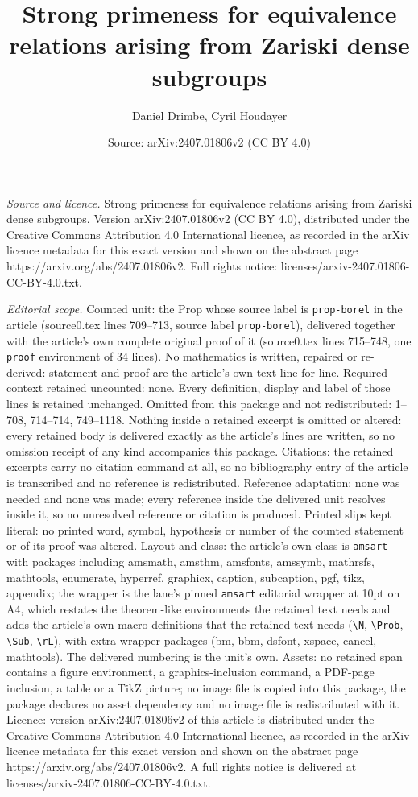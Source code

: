 \documentclass[10pt,a4paper]{amsart}
\title[Strong primeness for equivalence relations arising from Zari]{Strong primeness for equivalence relations arising from Zariski dense subgroups}
\author{Daniel Drimbe, Cyril Houdayer}
\date{Source: arXiv:2407.01806v2 (CC BY 4.0)}
\begin{document}
\maketitle

\noindent\emph{Source and licence.} Strong primeness for equivalence relations arising from Zariski dense subgroups. Version arXiv:2407.01806v2 (CC BY 4.0), distributed under the Creative Commons Attribution 4.0 International licence, as recorded in the arXiv licence metadata for this exact version and shown on the abstract page https://arxiv.org/abs/2407.01806v2. Full rights notice: licenses/arxiv-2407.01806-CC-BY-4.0.txt.\par\smallskip

\noindent\textit{Editorial scope.} Counted unit: the Prop whose source label is \texttt{prop-borel} in the article (source0.tex lines 709--713, source label \texttt{prop-borel}), delivered together with the article's own complete original proof of it (source0.tex lines 715--748, one \texttt{proof} environment of 34 lines). No mathematics is written, repaired or re-derived: statement and proof are the article's own text line for line. Required context retained uncounted: none. Every definition, display and label of those lines is retained unchanged. Omitted from this package and not redistributed: 1--708, 714--714, 749--1118. Nothing inside a retained excerpt is omitted or altered: every retained body is delivered exactly as the article's lines are written, so no omission receipt of any kind accompanies this package. Citations: the retained excerpts carry no citation command at all, so no bibliography entry of the article is transcribed and no reference is redistributed. Reference adaptation: none was needed and none was made; every reference inside the delivered unit resolves inside it, so no unresolved reference or citation is produced. Printed slips kept literal: no printed word, symbol, hypothesis or number of the counted statement or of its proof was altered. Layout and class: the article's own class is \texttt{amsart} with packages including amsmath, amsthm, amsfonts, amssymb, mathrsfs, mathtools, enumerate, hyperref, graphicx, caption, subcaption, pgf, tikz, appendix; the wrapper is the lane's pinned \texttt{amsart} editorial wrapper at 10pt on A4, which restates the theorem-like environments the retained text needs and adds the article's own macro definitions that the retained text needs (\texttt{\textbackslash N}, \texttt{\textbackslash Prob}, \texttt{\textbackslash Sub}, \texttt{\textbackslash rL}), with extra wrapper packages (bm, bbm, dsfont, xspace, cancel, mathtools). The delivered numbering is the unit's own. Assets: no retained span contains a figure environment, a graphics-inclusion command, a PDF-page inclusion, a table or a TikZ picture; no image file is copied into this package, the package declares no asset dependency and no image file is redistributed with it. Licence: version arXiv:2407.01806v2 of this article is distributed under the Creative Commons Attribution 4.0 International licence, as recorded in the arXiv licence metadata for this exact version and shown on the abstract page https://arxiv.org/abs/2407.01806v2. A full rights notice is delivered at licenses/arxiv-2407.01806-CC-BY-4.0.txt. 
\end{document}
